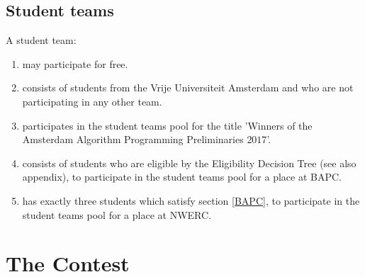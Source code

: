 \documentclass[11pt]{report}
\begin{document}
\section{Student teams}
A student team:
\begin{enumerate}[label=\bfseries 3.1.\arabic*]
\item may participate for free.
\item consists of students from the Vrije Universiteit Amsterdam and who are not participating in any other team.
\item participates in the student teams pool for the title 'Winners of the Amsterdam Algorithm Programming Preliminaries $2017$'.
\item \label{BAPC} consists of students who are eligible by the Eligibility Decision Tree (see also appendix), to participate in the student teams pool for a place at BAPC.
\item \label{NWERC} has exactly three students which satisfy section \ref{BAPC}, to participate in the student teams pool for a place at NWERC.
\end{enumerate}


\chapter{The Contest}
\end{document}
